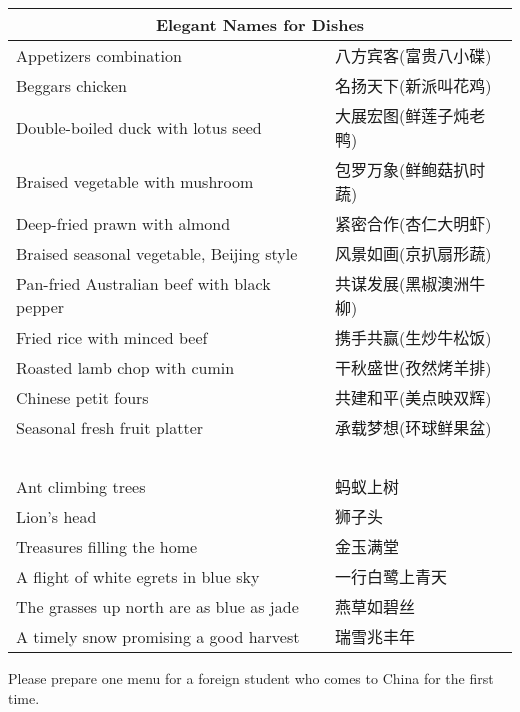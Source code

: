 \begin{longtable}{|p{7cm}|p{7cm}|}
    \multicolumn{2}{c}{\textbf{Elegant Names for Dishes}} \\ \hline
    Appetizers combination & 八方宾客(富贵八小碟) \\ \hline
    Beggars chicken & 名扬天下(新派叫花鸡) \\ \hline
    Double-boiled duck with lotus seed & 大展宏图(鲜莲子炖老鸭) \\ \hline
    Braised vegetable with mushroom & 包罗万象(鲜鲍菇扒时蔬) \\ \hline
    Deep-fried prawn with almond & 紧密合作(杏仁大明虾) \\ \hline
    Braised seasonal vegetable, Beijing style & 风景如画(京扒扇形蔬) \\ \hline
    Pan-fried Australian beef with black pepper & 共谋发展(黑椒澳洲牛柳) \\ \hline
    Fried rice with minced beef & 携手共赢(生炒牛松饭) \\ \hline
    Roasted lamb chop with cumin & 干秋盛世(孜然烤羊排) \\ \hline
    Chinese petit fours & 共建和平(美点映双辉) \\ \hline
    Seasonal fresh fruit platter & 承载梦想(环球鲜果盆) \\ \hline
    ~ & ~ \\ \hline
    Ant climbing trees & 蚂蚁上树 \\ \hline
    Lion's head & 狮子头 \\ \hline
    Treasures filling the home & 金玉满堂 \\ \hline
    A flight of white egrets in blue sky & 一行白鹭上青天 \\ \hline
    The grasses up north are as blue as jade & 燕草如碧丝 \\ \hline
    A timely snow promising a good harvest & 瑞雪兆丰年 \\ \hline
    
\end{longtable}

\begin{question}{}{}
    Please prepare one menu for a foreign student who comes to China for the first time.
\end{question}

